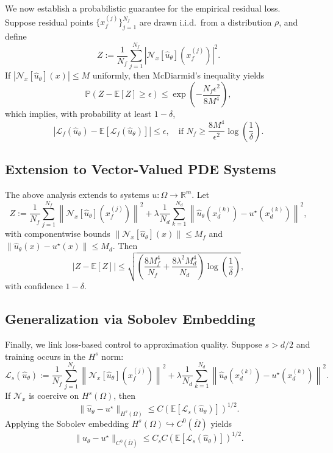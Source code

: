 \documentclass[11pt, a4paper]{article}
\begin{document}
We now establish a probabilistic guarantee for the empirical residual loss. Suppose residual points $\{x_f^{(j)}\}_{j=1}^{N_f}$ are drawn i.i.d.\ from a distribution $\rho$, and define
\[
Z := \frac{1}{N_f} \sum_{j=1}^{N_f} \left| \mathcal{N}_x[\hat{u}_\theta](x_f^{(j)}) \right|^2.
\]
If $|\mathcal{N}_x[\hat{u}_\theta](x)| \leq M$ uniformly, then McDiarmid’s inequality yields
\[
\mathbb{P} \left( Z - \mathbb{E}[Z] \geq \epsilon \right) \leq \exp\left( - \frac{N_f \epsilon^2}{8 M^4} \right),
\]
which implies, with probability at least $1 - \delta$,
\[
\left| \mathcal{L}_f(\hat{u}_\theta) - \mathbb{E}[ \mathcal{L}_f(\hat{u}_\theta) ] \right| \leq \epsilon, \quad \text{if } N_f \geq \frac{8 M^4}{\epsilon^2} \log\left( \frac{1}{\delta} \right).
\]

\subsection{Extension to Vector-Valued PDE Systems}

The above analysis extends to systems $u : \Omega \to \mathbb{R}^m$. Let
\[
Z := \frac{1}{N_f} \sum_{j=1}^{N_f} \left\| \mathcal{N}_x[\hat{u}_\theta](x_f^{(j)}) \right\|^2 + \lambda \frac{1}{N_d} \sum_{k=1}^{N_d} \left\| \hat{u}_\theta(x_d^{(k)}) - u^\star(x_d^{(k)}) \right\|^2,
\]
with componentwise bounds $\| \mathcal{N}_x[\hat{u}_\theta](x) \| \leq M_f$ and $\| \hat{u}_\theta(x) - u^\star(x) \| \leq M_d$. Then
\[
\left| Z - \mathbb{E}[Z] \right| \leq \sqrt{ \left( \frac{8 M_f^4}{N_f} + \frac{8 \lambda^2 M_d^4}{N_d} \right) \log \left( \frac{1}{\delta} \right) },
\]
with confidence $1 - \delta$.

\subsection{Generalization via Sobolev Embedding}

Finally, we link loss-based control to approximation quality. Suppose $s > d/2$ and training occurs in the $H^s$ norm:
\[
\mathcal{L}_s(\hat{u}_\theta) := \frac{1}{N_f} \sum_{j=1}^{N_f} \left\| \mathcal{N}_x[\hat{u}_\theta](x_f^{(j)}) \right\|^2 + \lambda \frac{1}{N_d} \sum_{k=1}^{N_d} \left\| \hat{u}_\theta(x_d^{(k)}) - u^\star(x_d^{(k)}) \right\|^2.
\]
If $\mathcal{N}_x$ is coercive on $H^s(\Omega)$, then
\[
\| \hat{u}_\theta - u^\star \|_{H^s(\Omega)} \leq C \left( \mathbb{E}[ \mathcal{L}_s(\hat{u}_\theta) ] \right)^{1/2}.
\]
Applying the Sobolev embedding $H^s(\Omega) \hookrightarrow C^0(\bar{\Omega})$ yields
\[
\| \hat{u}_\theta - u^\star \|_{C^0(\bar{\Omega})} \leq C_s C \left( \mathbb{E}[ \mathcal{L}_s(\hat{u}_\theta) ] \right)^{1/2}.
\]
\end{document}
